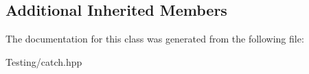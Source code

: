 \subsection*{Additional Inherited Members}


The documentation for this class was generated from the following file\-:\begin{DoxyCompactItemize}
\item 
Testing/catch.\-hpp\end{DoxyCompactItemize}
